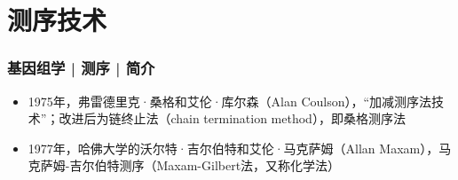 \section{测序技术}
\begin{frame}[label=current]
  \frametitle{基因组学 | 测序 | 简介}
   \begin{itemize}
     \item 1975年，弗雷德里克·桑格和艾伦·库尔森（Alan Coulson），“加减测序法技术”；改进后为链终止法（chain termination method），即桑格测序法
     \item 1977年，哈佛大学的沃尔特·吉尔伯特和艾伦·马克萨姆（Allan Maxam），马克萨姆-吉尔伯特测序（Maxam-Gilbert法，又称化学法）
   \end{itemize} 
\end{frame}
